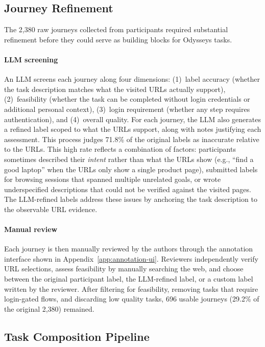\documentclass{article}
\theoremstyle{plain}
\theoremstyle{definition}
\theoremstyle{remark}
\def\odysseys{Odysseys\xspace}
\begin{document}
\clearpage
\subsection{Journey Refinement} \label{app:refinement}

The 2,380 raw journeys collected from participants required substantial refinement before they could serve as building blocks for \odysseys tasks.

\paragraph{LLM screening} An LLM screens each journey along four dimensions: (1)~label accuracy (whether the task description matches what the visited URLs actually support), (2)~feasibility (whether the task can be completed without login credentials or additional personal context), (3)~login requirement (whether any step requires authentication), and (4)~overall quality. For each journey, the LLM also generates a refined label scoped to what the URLs support, along with notes justifying each assessment. This process judges 71.8\% of the original labels as inaccurate relative to the URLs. This high rate reflects a combination of factors: participants sometimes described their \textit{intent} rather than what the URLs show (e.g., ``find a good laptop'' when the URLs only show a single product page), submitted labels for browsing sessions that spanned multiple unrelated goals, or wrote underspecified descriptions that could not be verified against the visited pages. The LLM-refined labels address these issues by anchoring the task description to the observable URL evidence.

\paragraph{Manual review} Each journey is then manually reviewed by the authors through the annotation interface shown in Appendix~\ref{app:annotation-ui}. Reviewers independently verify URL selections, assess feasibility by manually searching the web, and choose between the original participant label, the LLM-refined label, or a custom label written by the reviewer. After filtering for feasibility, removing tasks that require login-gated flows, and discarding low quality tasks, 696 usable journeys (29.2\% of the original 2,380) remained.

\clearpage
\subsection{Task Composition Pipeline} \label{app:composition-pipeline}
\end{document}
